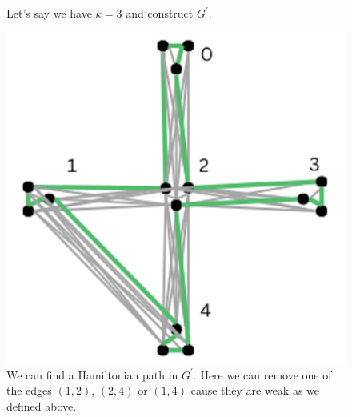 \documentclass{article}
\begin{document}
\begin{enumerate}
\begin{enumerate}
\begin{figure}[H]
\begin{minipage}{0.3\textwidth}
                \caption{Let's say we have $k=3$ and construct $G^\prime$.}
            \end{minipage}
            \hspace{0.5cm}
            \begin{minipage}{0.3\textwidth}
                \centering
                \includegraphics[width=\textwidth]{image9.png}
                \caption{We can find a Hamiltonian path in $G^\prime$. Here we can remove one of the edges $(1,2)$, $(2,4)$ or $(1,4)$ cause they are weak as we defined above.}
            \end{minipage}
        \end{figure}


\end{enumerate}
\end{enumerate}
\end{document}
